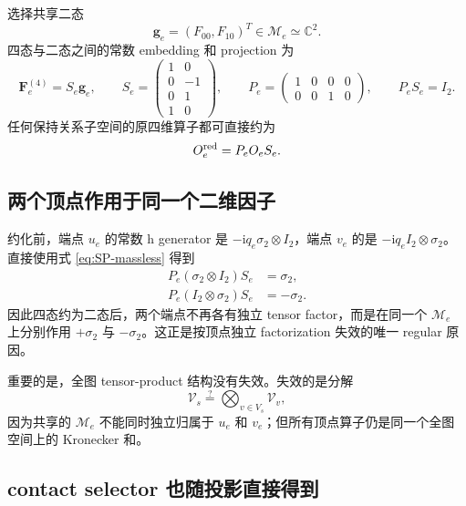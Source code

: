 \documentclass[11pt,a4paper]{ctexart}
\newcommand{\ii}{\mathrm i}
\newcommand{\cV}{\mathcal V}
\newcommand{\cM}{\mathcal M}
\begin{document}
选择共享二态
\begin{equation}
 \bm g_e=(F_{00},F_{10})^T\in\cM_e\simeq\mathbb C^2.
\end{equation}
四态与二态之间的常数 embedding 和 projection 为
\begin{equation}
 \boxed{
 \bm F_e^{(4)}=S_e\bm g_e,
 \qquad
 S_e=
 \begin{pmatrix}
 1&0\\
 0&-1\\
 0&1\\
 1&0
 \end{pmatrix},
 \qquad
 P_e=
 \begin{pmatrix}
 1&0&0&0\\
 0&0&1&0
 \end{pmatrix},
 \qquad P_eS_e=I_2.
 }
 \label{eq:SP-massless}
\end{equation}
任何保持关系子空间的原四维算子都可直接约为
\begin{equation}
 O_e^{\rm red}=P_eO_eS_e.
 \label{eq:POS-reduction}
\end{equation}

\subsection{两个顶点作用于同一个二维因子}

约化前，端点 $u_e$ 的常数 h generator 是 $-\ii q_e\sigma_2\otimes I_2$，端点 $v_e$ 的是 $-\ii q_eI_2\otimes\sigma_2$。直接使用式 \eqref{eq:SP-massless} 得到
\begin{align}
 P_e(\sigma_2\otimes I_2)S_e&=\sigma_2,
 \label{eq:first-endpoint-projection}\\
 P_e(I_2\otimes\sigma_2)S_e&=-\sigma_2.
 \label{eq:second-endpoint-projection}
\end{align}
因此四态约为二态后，两个端点不再各有独立 tensor factor，而是在同一个 $\cM_e$ 上分别作用 $+\sigma_2$ 与 $-\sigma_2$。这正是按顶点独立 factorization 失效的唯一 regular 原因。

重要的是，全图 tensor-product 结构没有失效。失效的是分解
\begin{equation}
 \cV_s\stackrel{?}{=}\bigotimes_{v\in V_s}\cV_v,
\end{equation}
因为共享的 $\cM_e$ 不能同时独立归属于 $u_e$ 和 $v_e$；但所有顶点算子仍是同一个全图空间上的 Kronecker 和。

\subsection{contact selector 也随投影直接得到}
\end{document}
